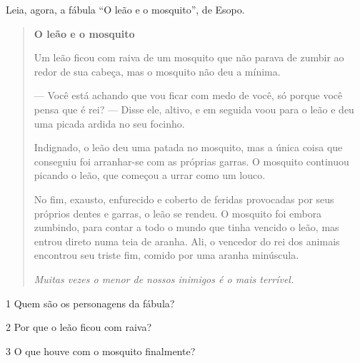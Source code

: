 
Leia, agora, a fábula ``O leão e o mosquito'', de Esopo.


\begin{quote}
\textbf{O leão e o mosquito}

Um leão ficou com raiva de um mosquito que não parava de zumbir ao redor
de sua cabeça, mas o mosquito não deu a mínima.

--- Você está achando que vou ficar com medo de você, só porque você
pensa que é rei? --- Disse ele, altivo, e em seguida voou para o leão e
deu uma picada ardida no seu focinho.

Indignado, o leão deu uma patada no mosquito, mas a única coisa que
conseguiu foi arranhar-se com as próprias garras. O mosquito continuou
picando o leão, que começou a urrar como um louco.

No fim, exausto, enfurecido e
coberto de feridas provocadas por seus próprios dentes e garras, o leão
se rendeu. O mosquito foi embora zumbindo, para contar a todo o mundo que
tinha vencido o leão, mas entrou direto numa teia de aranha. Ali, o
vencedor do rei dos animais encontrou seu triste fim, comido por uma
aranha minúscula.

\emph{Muitas vezes o menor de nossos inimigos é o mais terrível.}

\end{quote}

\num{1} Quem são os personagens da fábula?


\num{2} Por que o leão ficou com raiva?


\pagebreak
\num{3} O que houve com o mosquito finalmente?

